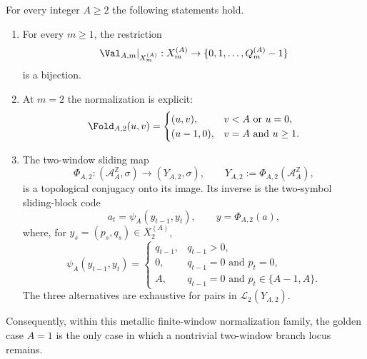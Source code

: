 \begin{theorem}
\label{thm:metallic-two-window-rigidity}
For every integer $A\ge 2$ the following statements hold.
\begin{enumerate}[label=(\roman*),leftmargin=*,itemsep=2pt]
  \item For every $m\ge 1$, the restriction
  \[
  \Val_{A,m}|_{X_m^{(A)}}:X_m^{(A)}\to
  \{0,1,\ldots,Q_m^{(A)}-1\}
  \]
  is a bijection.
  \item At $m=2$ the normalization is explicit:
  \[
  \Fold_{A,2}(u,v)=
  \begin{cases}
  (u,v), & v<A\text{ or }u=0,\\
  (u-1,0), & v=A\text{ and }u\ge 1.
  \end{cases}
  \]
  \item The two-window sliding map
  \[
  \Phi_{A,2}:(\mathcal A_A^{\mathbb Z},\sigma)\to
  (Y_{A,2},\sigma),
  \qquad
  Y_{A,2}:=\Phi_{A,2}(\mathcal A_A^{\mathbb Z}),
  \]
  is a topological conjugacy onto its image.  Its inverse is the
  two-symbol sliding-block code
  \[
  a_t=\psi_A(y_{t-1},y_t),\qquad y=\Phi_{A,2}(a),
  \]
  where, for $y_s=(p_s,q_s)\in X_2^{(A)}$,
  \[
  \psi_A(y_{t-1},y_t)=
  \begin{cases}
  q_{t-1}, & q_{t-1}>0,\\
  0, & q_{t-1}=0\text{ and }p_t=0,\\
  A, & q_{t-1}=0\text{ and }p_t\in\{A-1,A\}.
  \end{cases}
  \]
  The three alternatives are exhaustive for pairs in $\mathcal L_2(Y_{A,2})$.
\end{enumerate}
Consequently, within this metallic finite-window normalization family, the
golden case $A=1$ is the only case in which a nontrivial two-window branch
locus remains.
\end{theorem}

